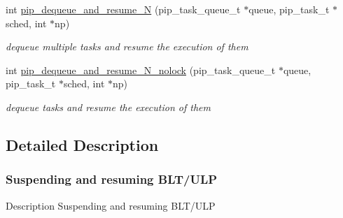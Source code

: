 \begin{DoxyCompactItemize}
int \hyperlink{group__ULP-2-suspension_gac26e54557d8e89fcdcb52a9df6c65998}{pip\-\_\-dequeue\-\_\-and\-\_\-resume\-\_\-\-N} (pip\-\_\-task\-\_\-queue\-\_\-t $\ast$queue, pip\-\_\-task\-\_\-t $\ast$sched, int $\ast$np)
\begin{DoxyCompactList}\small\item\em dequeue multiple tasks and resume the execution of them \end{DoxyCompactList}\item 
int \hyperlink{group__ULP-2-suspension_ga939e70924803be491c2f6f10b364e803}{pip\-\_\-dequeue\-\_\-and\-\_\-resume\-\_\-\-N\-\_\-nolock} (pip\-\_\-task\-\_\-queue\-\_\-t $\ast$queue, pip\-\_\-task\-\_\-t $\ast$sched, int $\ast$np)
\begin{DoxyCompactList}\small\item\em dequeue tasks and resume the execution of them \end{DoxyCompactList}\end{DoxyCompactItemize}


\subsection{Detailed Description}
\hypertarget{ulp-suspension}{}\subsubsection{Suspending and resuming B\-L\-T/\-U\-L\-P}\label{ulp-suspension}
\begin{DoxyParagraph}{Description}
Suspending and resuming B\-L\-T/\-U\-L\-P 
\end{DoxyParagraph}


